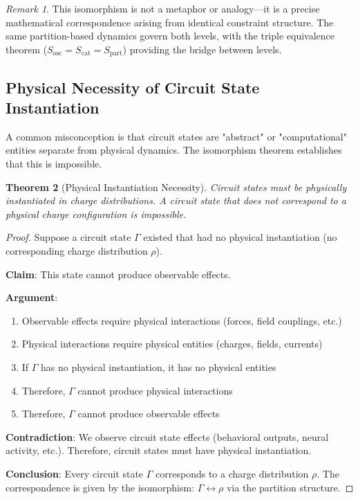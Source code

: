 \documentclass[aps,prd,twocolumn,superscriptaddress,floatfix,nofootinbib]{revtex4-2}
\newtheorem{theorem}{Theorem}[section]
\theoremstyle{remark}
\newtheorem{remark}[theorem]{Remark}
\begin{document}
\begin{remark}
This isomorphism is not a metaphor or analogy—it is a precise mathematical correspondence arising from identical constraint structure. The same partition-based dynamics govern both levels, with the triple equivalence theorem ($S_{\text{osc}} = S_{\text{cat}} = S_{\text{part}}$) providing the bridge between levels.
\end{remark}

\subsection{Physical Necessity of Circuit State Instantiation}

A common misconception is that circuit states are "abstract" or "computational" entities separate from physical dynamics. The isomorphism theorem establishes that this is impossible.

\begin{theorem}[Physical Instantiation Necessity]
\label{thm:physical_necessity}
Circuit states must be physically instantiated in charge distributions. A circuit state that does not correspond to a physical charge configuration is impossible.
\end{theorem}

\begin{proof}
Suppose a circuit state $\Gamma$ existed that had no physical instantiation (no corresponding charge distribution $\rho$).

\textbf{Claim}: This state cannot produce observable effects.

\textbf{Argument}:
\begin{enumerate}
\item Observable effects require physical interactions (forces, field couplings, etc.)
\item Physical interactions require physical entities (charges, fields, currents)
\item If $\Gamma$ has no physical instantiation, it has no physical entities
\item Therefore, $\Gamma$ cannot produce physical interactions
\item Therefore, $\Gamma$ cannot produce observable effects
\end{enumerate}

\textbf{Contradiction}: We observe circuit state effects (behavioral outputs, neural activity, etc.). Therefore, circuit states must have physical instantiation.

\textbf{Conclusion}: Every circuit state $\Gamma$ corresponds to a charge distribution $\rho$. The correspondence is given by the isomorphism: $\Gamma \leftrightarrow \rho$ via the partition structure.
\end{proof}
\end{document}
